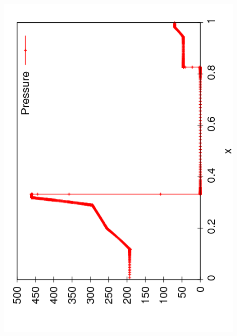 \documentclass{beamer}
\begin{document}
\begin{frame}
\begin{columns}
\begin{column}{0.5\textwidth}
\begin{overlayarea}{\textwidth}{0.9\textheight}
{          \includegraphics[angle=-90,width=0.9\textwidth]{figures/AMR_Pressure_100}
        }
        {
}
\end{overlayarea}
\end{column}
\end{columns}
\end{frame}
\end{document}
